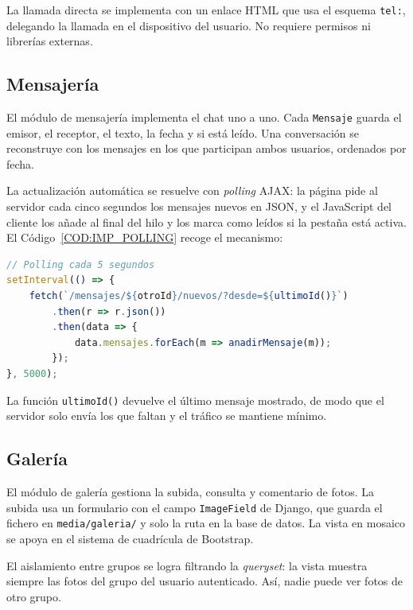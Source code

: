 La llamada directa se implementa con un enlace HTML que usa el esquema
\texttt{tel:}, delegando la llamada en el dispositivo del usuario. No
requiere permisos ni librerías externas.
\subsection{Mensajería\label{SUB:IMP_MENSAJES}}

El módulo de mensajería implementa el chat uno a uno. Cada \texttt{Mensaje}
guarda el emisor, el receptor, el texto, la fecha y si está leído. Una
conversación se reconstruye con los mensajes en los que participan ambos
usuarios, ordenados por fecha.

La actualización automática se resuelve con \emph{polling} AJAX: la página
pide al servidor cada cinco segundos los mensajes nuevos en JSON, y el
JavaScript del cliente los añade al final del hilo y los marca como leídos
si la pestaña está activa. El Código~\ref{COD:IMP_POLLING} recoge el
mecanismo:

\begin{lstlisting}[language=JavaScript, caption={Sondeo AJAX
periódico para la actualización del chat sin recargar la página.},
label={COD:IMP_POLLING}]
// Polling cada 5 segundos
setInterval(() => {
    fetch(`/mensajes/${otroId}/nuevos/?desde=${ultimoId()}`)
        .then(r => r.json())
        .then(data => {
            data.mensajes.forEach(m => anadirMensaje(m));
        });
}, 5000);
\end{lstlisting}

La función \texttt{ultimoId()} devuelve el último mensaje mostrado, de modo
que el servidor solo envía los que faltan y el tráfico se mantiene mínimo.

\subsection{Galería\label{SUB:IMP_GALERIA}}

El módulo de galería gestiona la subida, consulta y comentario de fotos. La
subida usa un formulario con el campo \texttt{ImageField} de Django, que
guarda el fichero en \texttt{media/galeria/} y solo la ruta en la base de
datos. La vista en mosaico se apoya en el sistema de cuadrícula de Bootstrap.

El aislamiento entre grupos se logra filtrando la \emph{queryset}: la vista
muestra siempre las fotos del grupo del usuario autenticado. Así, nadie
puede ver fotos de otro grupo.

